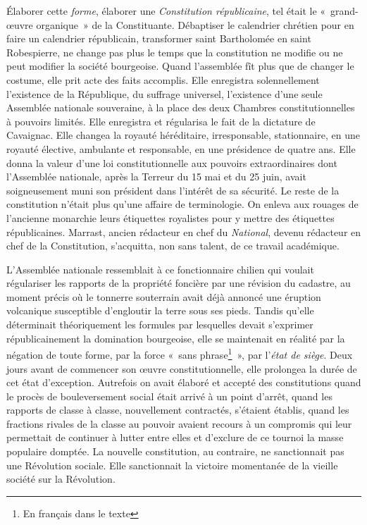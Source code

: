 \documentclass[twoside]{book} %
\begin{document}
Élaborer cette \emph{forme}, élaborer une \emph{Constitution républicaine}, tel était le « grand-œuvre organique » de la Constituante. Débaptiser le calendrier chrétien pour en faire un calendrier républicain, transformer saint Bartholomée en saint Robespierre, ne change pas plus le temps que la constitution ne modifie ou ne peut modifier la société bourgeoise. Quand l’assemblée fît plus que de changer le costume, elle prit acte des faits accomplis. Elle enregistra solennellement l’existence de la République, du suffrage universel, l’existence d’une seule Assemblée nationale souveraine, à la place des deux Chambres constitutionnelles à pouvoirs limités. Elle enregistra et régularisa le fait de la dictature de Cavaignac. Elle changea la royauté héréditaire, irresponsable, stationnaire, en une royauté élective, ambulante et responsable, en une présidence de quatre ans. Elle donna la valeur d’une loi constitutionnelle aux pouvoirs extraordinaires dont l’Assemblée nationale, après la Terreur du 15 mai et du 25 juin, avait soigneusement muni son président dans l’intérêt de sa sécurité. Le reste de la constitution n’était plus qu’une affaire de terminologie. On enleva aux rouages de l’ancienne monarchie leurs étiquettes royalistes pour y mettre des étiquettes républicaines. Marrast, ancien rédacteur en chef du \emph{National}, devenu rédacteur en chef de la Constitution, s’acquitta, non sans talent, de ce travail académique.\par
L’Assemblée nationale ressemblait à ce fonctionnaire chilien qui voulait régulariser les rapports de la propriété foncière par une révision du cadastre, au moment précis où le tonnerre souterrain avait déjà annoncé une éruption volcanique susceptible d’engloutir la terre sous ses pieds. Tandis qu’elle déterminait théoriquement les formules par lesquelles devait s’exprimer républicainement la domination bourgeoise, elle se maintenait en réalité par la négation de toute forme, par la force « sans phrase\footnote{En français dans le texte} », par l’\emph{état de siège}. Deux jours avant de commencer son œuvre constitutionnelle, elle prolongea la durée de cet état d’exception. Autrefois on avait élaboré et accepté des constitutions quand le procès de bouleversement social était arrivé à un point d’arrêt, quand les rapports de classe à classe, nouvellement contractés, s’étaient établis, quand les fractions rivales de la classe au pouvoir avaient recours à un compromis qui leur permettait de continuer à lutter entre elles et d’exclure de ce tournoi la masse populaire domptée. La nouvelle constitution, au contraire, ne sanctionnait pas une Révolution sociale. Elle sanctionnait la victoire momentanée de la vieille société sur la Révolution.\par
\end{document}
